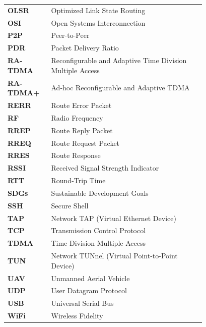 \begin{longtable}{@{}l@{\hspace{1.5em}}p{0.78\linewidth}@{}}
\textbf{OLSR}      & Optimized Link State Routing \\
\textbf{OSI}       & Open Systems Interconnection \\
\textbf{P2P}       & Peer-to-Peer \\
\textbf{PDR}       & Packet Delivery Ratio \\
\textbf{RA-TDMA}   & Reconfigurable and Adaptive Time Division Multiple Access \\
\textbf{RA-TDMA+}  & Ad-hoc Reconfigurable and Adaptive TDMA \\
\textbf{RERR}      & Route Error Packet \\
\textbf{RF}        & Radio Frequency \\
\textbf{RREP}      & Route Reply Packet \\
\textbf{RREQ}      & Route Request Packet \\
\textbf{RRES}      & Route Response \\
\textbf{RSSI}      & Received Signal Strength Indicator \\
\textbf{RTT}       & Round-Trip Time \\
\textbf{SDGs}      & Sustainable Development Goals \\
\textbf{SSH}       & Secure Shell \\
\textbf{TAP}       & Network TAP (Virtual Ethernet Device) \\
\textbf{TCP}       & Transmission Control Protocol \\
\textbf{TDMA}      & Time Division Multiple Access \\
\textbf{TUN}       & Network TUNnel (Virtual Point-to-Point Device) \\
\textbf{UAV}       & Unmanned Aerial Vehicle \\
\textbf{UDP}       & User Datagram Protocol \\
\textbf{USB}       & Universal Serial Bus \\
\textbf{WiFi}      & Wireless Fidelity \\
\end{longtable}
